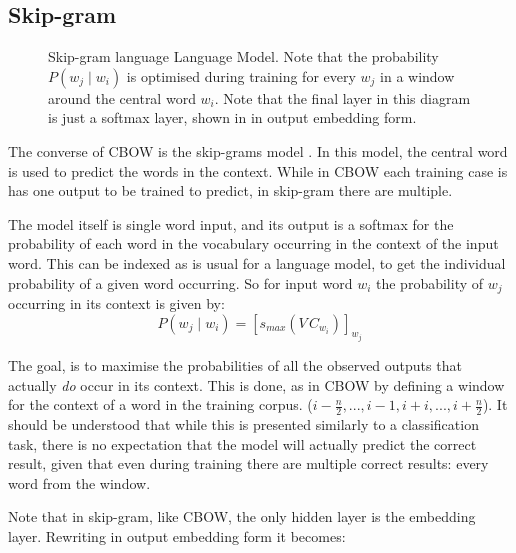 \documentclass[parskip]{komatufte}
\begin{document}
\subsection{Skip-gram}\label{sec:skip-gram}
\begin{figure}
	\caption{\label{fig:skip-gram} Skip-gram language Language Model. Note that the probability $P(w_j \mid w_i)$ is optimised during training for every $w_j$ in a window around the central word $w_i$.
	Note that the final layer in this diagram is just a softmax layer, shown in in output embedding form.
	}
	\centering
	 
\end{figure}




The converse of CBOW is the skip-grams model .
In this model, the central word is used to predict the words in the context.
While in CBOW each training case is has one output to be trained to predict, in skip-gram there are multiple.

The model itself is single word input, and its output is a softmax for the probability of each word in the vocabulary occurring in the context of the input word.
This can be indexed as is usual for a language model, to get the individual probability of a given word occurring.
So for input word $w_i$ the probability of $w_j$ occurring in its context is given by:
\begin{equation}
P(w_j \mid w_{i}) = \left[s_{max}(V\,C_{w_{i}}) \right]_{w_j} \label{equ:skipgram}
\end{equation}


The goal, is to maximise the probabilities of all the observed outputs that actually \emph{do} occur in its context.
This is done, as in CBOW by defining a window for the context of a word in the training corpus. ($i-\frac{n}{2},...,i-1, i+i,...,i+\frac{n}{2}$).
It should be understood that while this is presented similarly to a classification task,
there is no expectation that the model will actually predict the correct result,
given that even during training there are multiple correct results: every word from the window.


Note that in skip-gram, like CBOW, the only hidden layer is the embedding layer.
Rewriting  in output embedding form it becomes:
\end{document}
